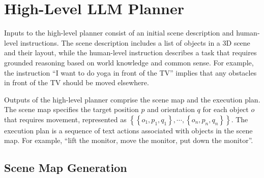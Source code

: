\section{High-Level LLM Planner}
\label{sec:high_level_planner}


Inputs to the high-level planner consist of an initial scene description and human-level instructions. The scene description includes a list of objects in a 3D scene and their layout, while the human-level instruction describes a task that requires grounded reasoning based on world knowledge and common sense. For example, the instruction ``I want to do yoga in front of the TV'' implies that any obstacles in front of the TV should be moved elsewhere.

Outputs of the high-level planner comprise the scene map and the execution plan.
The scene map specifies the target position $p$ and orientation $q$ for each object $o$ that requires movement, represented as $\left\{ \left\{o_1, p_1, q_1 \right\}, \cdots, \left\{o_n, p_n, q_n \right\}\right\}$.
The execution plan is a sequence of text actions associated with objects in the scene map. For example, “lift the monitor, move the monitor, put down the monitor”.

\subsection{Scene Map Generation}
\label{subsec:spatial_relationship}

